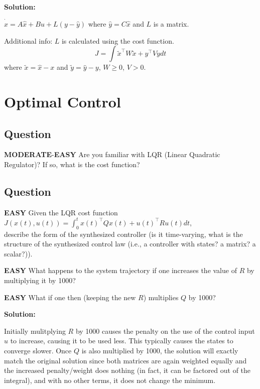 \documentclass{article}
\newenvironment{Solution}{
\begin{tcolorbox}
\color{purple}
\textbf{Solution:}
}
{
\end{tcolorbox}
\ignorespacesafterend
}
\newcommand{\RatingBase}[2]{\textcolor{#1}{{\fontfamily{phv}\selectfont\textbf{#2}}}}
\newcommand{\Easy}{\RatingBase{green!50!black!50}{EASY}}
\newcommand{\Moderate}{\RatingBase{yellow!50!black!50}{MODERATE}}
\begin{document}
\begin{Solution}
$\dot{\hat{x}}=A \hat{x} + B u + L(y-\hat{y})$ where $\hat{y} = C\hat{x}$ and $L$ is a matrix.

Additional info: $L$ is calculated using the cost function.
\begin{equation}
J = \int{\tilde{x}^\top W\tilde{x} + y^\top V y dt}
\end{equation}
where $\tilde{x} = \hat{x}-x$ and $\tilde{y} = \hat{y}-y$, $W\ge 0$, $V>0$.
\end{Solution}

\section{Optimal Control}
\subsection{Question} \Moderate{}-\Easy{}
Are you familiar with LQR  (Linear Quadratic Regulator)? If so, what is the cost function?  

\subsection{Question}
\Easy{} Given the LQR cost function \\

$J(x(t),u(t)) = \int_{0}^{t}{ x(t)^\top Q x(t) + u(t)^\top R u(t)} dt$, \\

describe the form of the synthesized controller (is it time-varying, what is the structure of the synthesized control law (i.e., a controller with states?  a matrix?  a scalar?)).

\Easy{} What happens to the system trajectory if one increases the value of $R$ by multiplying it by 1000?  

\Easy{} What if one then (keeping the new $R$) multiplies $Q$ by 1000?


\begin{Solution}
Initially mulitplying $R$ by 1000 causes the penalty on the use of the control input $u$ to increase, causing it to be used less.  This typically causes the states to converge slower.  Once $Q$ is also multiplied by 1000, the solution will exactly match the original solution since both matrices are again weighted equally and the increased penalty/weight does nothing (in fact, it can be factored out of the integral), and with no other terms, it does not change the minimum.
\end{Solution}
\end{document}

